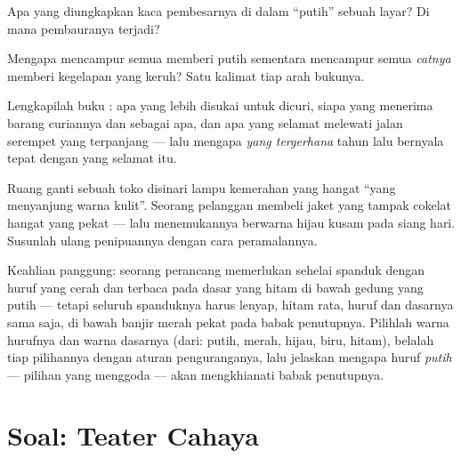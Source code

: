 \begin{exercise}[$\star$]\label{exo:g8:colors-spectra:8}
Apa yang diungkapkan kaca pembesarnya di dalam ``putih'' sebuah layar?
Di mana pembauranya terjadi?
\end{exercise}

\begin{exercise}[$\star\star$]\label{exo:g8:colors-spectra:9}
Mengapa mencampur semua \emph{} memberi putih sementara
mencampur semua \emph{catnya} memberi kegelapan yang keruh? Satu
kalimat tiap arah bukunya.
\end{exercise}

\begin{exercise}[$\star\star$]\label{exo:g8:colors-spectra:10}
Lengkapilah buku : apa yang lebih disukai 
untuk dicuri, siapa yang menerima barang curiannya dan sebagai apa,
dan apa yang selamat melewati jalan serempet yang terpanjang --- lalu
mengapa \emph{ yang tergerhana} tahun lalu bernyala tepat dengan
yang selamat itu.
\end{exercise}

\begin{exercise}[$\star\star$]\label{exo:g8:colors-spectra:11}
Ruang ganti sebuah toko disinari lampu kemerahan yang hangat ``yang
menyanjung warna kulit''. Seorang pelanggan membeli jaket yang tampak
cokelat hangat yang pekat --- lalu menemukannya berwarna hijau kusam
pada siang hari. Susunlah ulang penipuannya dengan cara peramalannya.
\end{exercise}

\begin{exercise}[$\star\star\star$]\label{exo:g8:colors-spectra:12}
Keahlian panggung: seorang perancang memerlukan sehelai spanduk dengan
huruf yang cerah dan terbaca pada dasar yang hitam di bawah 
gedung yang putih --- tetapi seluruh spanduknya harus lenyap, hitam
rata, huruf dan dasarnya sama saja, di bawah banjir merah pekat pada
babak penutupnya. Pilihlah warna hurufnya dan warna dasarnya (dari:
putih, merah, hijau, biru, hitam), belalah tiap pilihannya dengan
aturan penguranganya, lalu jelaskan mengapa huruf \emph{putih} ---
pilihan yang menggoda --- akan mengkhianati babak penutupnya.
\end{exercise}

\section{Soal: Teater Cahaya}

